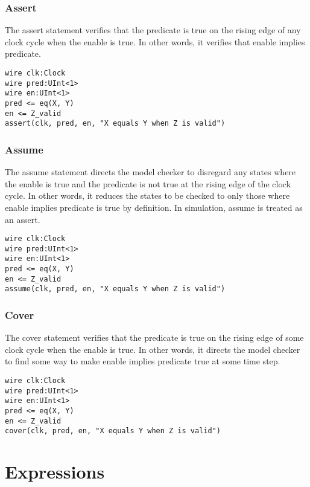 \documentclass[12pt]{article}
\begin{document}
\subsubsection{Assert}

The assert statement verifies that the predicate is true on the rising edge of any clock cycle when the enable is true. In other words, it verifies that enable implies predicate.

\begin{lstlisting}
wire clk:Clock
wire pred:UInt<1>
wire en:UInt<1>
pred <= eq(X, Y)
en <= Z_valid
assert(clk, pred, en, "X equals Y when Z is valid")
\end{lstlisting}

\subsubsection{Assume}

The assume statement directs the model checker to disregard any states where the enable is true and the predicate is not true at the rising edge of the clock cycle. In other words, it reduces the states to be checked to only those where enable implies predicate is true by definition. In simulation, assume is treated as an assert.

\begin{lstlisting}
wire clk:Clock
wire pred:UInt<1>
wire en:UInt<1>
pred <= eq(X, Y)
en <= Z_valid
assume(clk, pred, en, "X equals Y when Z is valid")
\end{lstlisting}

\subsubsection{Cover}

The cover statement verifies that the predicate is true on the rising edge of some clock cycle when the enable is true. In other words, it directs the model checker to find some way to make enable implies predicate true at some time step.

\begin{lstlisting}
wire clk:Clock
wire pred:UInt<1>
wire en:UInt<1>
pred <= eq(X, Y)
en <= Z_valid
cover(clk, pred, en, "X equals Y when Z is valid")
\end{lstlisting}

\section{Expressions}
\end{document}
